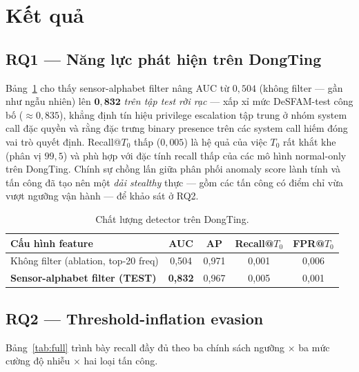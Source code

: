 \section{Kết quả}\label{sec:results}

\subsection{RQ1 — Năng lực phát hiện trên DongTing}
Bảng~\ref{tab:detector} cho thấy sensor-alphabet filter nâng AUC từ $0{,}504$ (không filter — gần như ngẫu nhiên) lên $\mathbf{0{,}832}$ \textit{trên tập test rời rạc} — xấp xỉ mức DeSFAM-test công bố ($\approx0{,}835$), khẳng định tín hiệu privilege escalation tập trung ở nhóm system call đặc quyền và rằng đặc trưng binary presence trên các system call hiếm đóng vai trò quyết định. Recall@$T_0$ thấp ($0{,}005$) là hệ quả của việc $T_0$ rất khắt khe (phân vị $99{,}5$) và phù hợp với đặc tính recall thấp của các mô hình normal-only trên DongTing. Chính sự chồng lấn giữa phân phối anomaly score lành tính và tấn công đã tạo nên một \textit{dải stealthy} thực — gồm các tấn công có điểm chỉ vừa vượt ngưỡng vận hành — để khảo sát ở RQ2.

\begin{table}[ht]
\caption{Chất lượng detector trên DongTing.}
\label{tab:detector}
\centering
\begin{tabular}{@{}lcccc@{}}
\toprule
\textbf{Cấu hình feature} & \textbf{AUC} & \textbf{AP} & \textbf{Recall@$T_0$} & \textbf{FPR@$T_0$} \\
\midrule
Không filter (ablation, top-20 freq) & 0{,}504 & 0{,}971 & 0{,}001 & 0{,}006 \\
\textbf{Sensor-alphabet filter (TEST)} & \textbf{0{,}832} & 0{,}967 & 0{,}005 & 0{,}001 \\
\bottomrule
\end{tabular}
\par{}
\end{table}

\subsection{RQ2 — Threshold-inflation evasion}
Bảng~\ref{tab:full} trình bày recall đầy đủ theo ba chính sách ngưỡng $\times$ ba mức cường độ nhiễu $\times$ hai loại tấn công.

